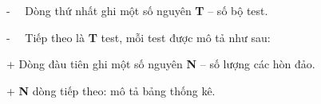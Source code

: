-   Dòng thứ nhất ghi một số nguyên \textbf{ T } – số bộ test.

-   Tiếp theo là \textbf{ T } test, mỗi test được mô tả như sau:

+ Dòng đàu tiên ghi một số nguyên \textbf{ N } – số lượng các hòn đảo.

+ \textbf{ N } dòng tiếp theo: mô tả bảng thống kê.